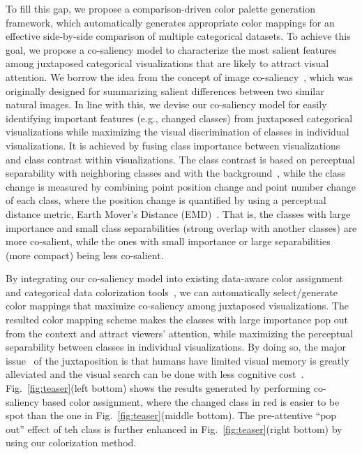 To fill this gap, we propose a comparison-driven color palette generation framework, which automatically generates appropriate color mappings for an effective side-by-side comparison of multiple categorical datasets. To achieve this goal, we propose a co-saliency model to characterize the most salient features among juxtaposed categorical visualizations that are likely to attract visual attention. We borrow the idea from the concept of image co-saliency~\cite{Jacobs10}, which was originally designed for summarizing salient differences between two similar natural images. %
In line with this, we devise our co-saliency model for easily identifying important features (e.g., changed classes) from juxtaposed categorical visualizations while maximizing the visual discrimination of classes in individual visualizations. It is achieved by fusing class importance between visualizations and class contrast within visualizations. The class contrast is based on perceptual separability with neighboring classes and with the background~\cite{Wang2018}, while
the class change is measured by combining point position change and point number change of each class, where the position change is quantified by using a perceptual distance metric,  Earth Mover's Distance (EMD)~\cite{rubner2000earth}.
That is, the classes with large importance and small class separabilities (strong overlap with another classes) are more co-salient, while the ones with small importance or large separabilities (more compact) being less co-salient.

By integrating our co-saliency model into existing data-aware color assignment and categorical data colorization tools~\cite{Wang2018, Lu21}, we can automatically select/generate color mappings that maximize co-saliency among juxtaposed visualizations. The resulted color mapping scheme makes the classes with large importance pop out from the context and attract viewers' attention,  while maximizing the perceptual separability between classes in individual visualizations. By doing so,
the major issue~\cite{Tominski12} of the juxtaposition is that humans have limited visual memory is greatly alleviated and the visual search can be done with less cognitive cost~\cite{healey1995visualizing}. Fig.~\ref{fig:teaser}(left bottom) shows the results generated by performing co-saliency based color assignment, where the changed class in red is easier to be spot than the one in Fig.~\ref{fig:teaser}(middle bottom). The pre-attentive ``pop out'' effect of teh class is further enhanced in Fig.~\ref{fig:teaser}(right bottom) by using our colorization method.

